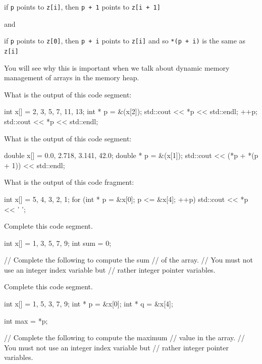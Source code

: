 if \texttt{p} points to \texttt{z[i]}, then \texttt{p + 1} points to
\texttt{z[i + 1]}

and

if \texttt{p} points to \texttt{z[0]}, then \texttt{p + i} points to
\texttt{z[i]} and so \texttt{*(p + i)} is the same as
\texttt{z[i]}

You will see why this is important when we talk about dynamic memory
management of arrays in the memory heap.

\begin{ex}
What is the output of this code segment:

\begin{consolethree}[escapeinside=||]
int x[] = {2, 3, 5, 7, 11, 13};
int * p = &(x[2]);
std::cout << *p << std::endl;
++p;
std::cout << *p << std::endl;
\end{consolethree}
\end{ex}

\begin{ex}
What is the output of this code segment:

\begin{consolethree}[escapeinside=||]
double x[] = {0.0, 2.718, 3.141, 42.0};
double * p = &(x[1]);
std::cout << (*p + *(p + 1)) << std::endl;
\end{consolethree}
\end{ex}

\begin{ex}
What is the output of this code fragment:

\begin{consolethree}[escapeinside=||]
int x[] = {5, 4, 3, 2, 1};
for (int * p = &x[0]; p <= &x[4]; ++p)
{
    std::cout << *p << ' ';
}
\end{consolethree}
\end{ex}

\begin{ex}
Complete this code segment.

\begin{consolethree}[escapeinside=||]
int x[] = {1, 3, 5, 7, 9};
int sum = 0;

// Complete the following to compute the sum
// of the array.
// You must not use an integer index variable but
// rather integer pointer variables.
\end{consolethree}
\end{ex}

\begin{ex}
Complete this code segment.

\begin{consolethree}[escapeinside=||]
int x[] = {1, 5, 3, 7, 9};
int * p = &x[0];
int * q = &x[4];

int max = *p;

// Complete the following to compute the maximum
// value in the array.
// You must not use an integer index variable but
// rather integer pointer variables.
\end{consolethree}
\end{ex}

